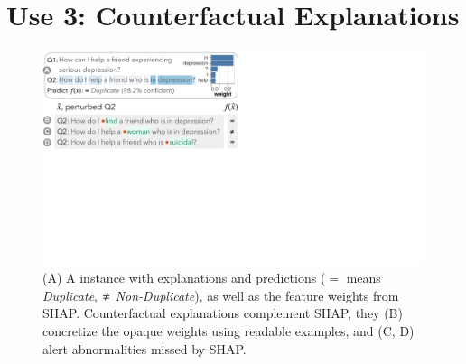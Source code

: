 
\newcommand{\fwone}[1]{\colbox{cfwone}{#1}\xspace}
\newcommand{\fwtwo}[1]{\colbox{cfwtwo}{#1}\xspace}
\newcommand{\fwthree}[1]{\colbox{cfwthree}{#1}\xspace}
\newcommand{\fwfour}[1]{\colbox{cfwfour}{#1}\xspace}

\newcommand{\fexp}[2]{\texttt{[{\color{darkgray}{#1:#2}}]}\xspace}
\newcommand{\fexptag}[1]{\fexp{TAG}{#1}}
\newcommand{\fexpfrom}[1]{\fexp{FROM}{#1}}
\newcommand{\fexpto}[1]{\fexp{TO}{#1}}
\newcommand{\fexptemp}[1]{\fexp{TEMP}{#1}}


\section{Use 3: Counterfactual Explanations}
\label{sec:app_explain}







\begin{figure}[t]
\centering
\includegraphics[trim={0 20cm 33cm 0cm},clip,width=1\columnwidth]{figures/explanation_v2}
\vspace{-15pt}
\caption{
(A) A \qqp instance with explanations and predictions ($\mathbf{=}$ means \emph{Duplicate}, $\mathbf{\not\eq}$ \emph{Non-Duplicate}), as well as the feature weights from SHAP.
Counterfactual explanations complement SHAP, \ie they (B) concretize the opaque weights using readable examples, and (C, D) alert abnormalities missed by SHAP.
}
\vspace{-10pt}
\label{fig:explanation}
\end{figure}

